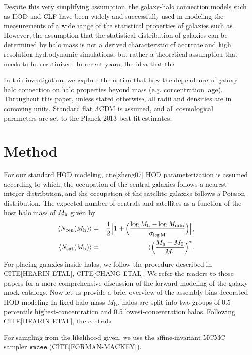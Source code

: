 \documentclass[12pt, preprint]{aastex}
\begin{document}
Despite this very simplifying assumption, the galaxy-halo connection models such as HOD and CLF
have been widely and successfully used in modeling the measurements of a wide range of the 
statistical properties of galaxies such as . However, the assumption that the statistical 
distribution of galaxies can be determined by halo mass is not a derived characteristic of 
accurate and high resolution hydrodynamic simulations, but rather a theoretical assumption 
that needs to be scrutinized. In recent years, the idea that the   

In this investigation, we explore the notion that how the dependence of 
galaxy-halo connection on halo properties beyond mass (e.g. concentration, age).
Throughout this paper, unless stated otherwise, 
all radii and densities are in comoving units. Standard flat $\Lambda$CDM is assumed, 
and all cosmological parameters are set to the Planck 2013 best-fit estimates.

\section{Method}
For our standard HOD modeling, cite[zheng07] HOD parameterization is assumed according to which, 
the occupation of the central galaxies follows a nearest-integer distribution, 
and the occupation of the satellite galaxies follows a Poisson distribution. 
The expected number of centrals and satellites as a function of the host halo 
mass of $M_{\rm h}$ given by 
\begin{eqnarray}
\langle N_{\rm cen}(M_{\rm h}) \rangle &=& \frac{1}{2}\Big[1+\Big(\frac{\log M_{\rm h} - \log M_{\rm min}}{\sigma_{\log \rm{M}}} \Big) \Big], \\ 
\langle N_{\rm sat}(M_{\rm h}) \rangle &=& \rangle \Big( \frac{M_{\rm h} - M_{\rm{0}}}{M_{\rm 1}} \Big)^{\alpha}.
\end{eqnarray}
For placing galaxies inside halos, we follow the procedure described in CITE[HEARIN ETAL], CITE[CHANG ETAL].
We refer the readers to those papers for a more comprehensive discussion of the forward modeling of the 
galaxy mock catalogs. Now let us provide a brief overview of the assembly bias decorated HOD modeling 
In fixed halo mass $M_{\rm h}$, halos are split into two groups of 0.5 percentile highest-concentration 
and 0.5 lowest-concentration halos. Following CITE[HEARIN ETAL], the centrals   


For sampling from the likelihood given, we use the affine-invariant MCMC sampler $\mathtt{emcee}$ (CITE[FORMAN-MACKEY]).
\end{document}
